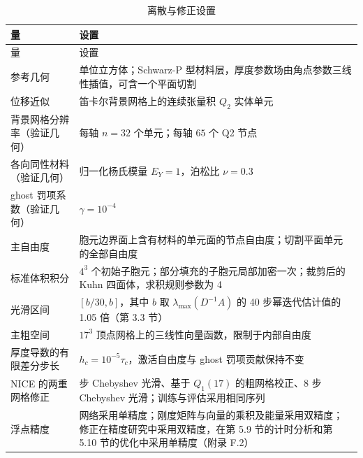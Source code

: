 \documentclass[preprint,12pt,authoryear]{elsarticle}
\begin{document}
{\small
\begin{longtable}[]{@{}
  >{\raggedright\arraybackslash}p{}
  >{\raggedright\arraybackslash}p{}@{}}
\caption{离散与修正设置}\tabularnewline
\toprule\noalign{}
\begin{minipage}[b]{\linewidth}\raggedright
量
\end{minipage} & \begin{minipage}[b]{\linewidth}\raggedright
设置
\end{minipage} \\
\midrule\noalign{}
\endfirsthead
\toprule\noalign{}
\begin{minipage}[b]{\linewidth}\raggedright
量
\end{minipage} & \begin{minipage}[b]{\linewidth}\raggedright
设置
\end{minipage} \\
\midrule\noalign{}
\endhead
\bottomrule\noalign{}
\endlastfoot
参考几何 & 单位立方体；Schwarz-P 型材料层，厚度参数场由角点参数三线性插值，可含一个平面切割 \\
位移近似 & 笛卡尔背景网格上的连续张量积 \(Q_2\) 实体单元 \\
背景网格分辨率（验证几何） & 每轴 \(n=32\) 个单元；每轴 \(65\) 个 Q2 节点 \\
各向同性材料（验证几何） & 归一化杨氏模量 \(E_Y=1\)，泊松比 \(\nu=0.3\) \\
ghost 罚项系数（验证几何） & \(\gamma=10^{-4}\) \\
主自由度 & 胞元边界面上含有材料的单元面的节点自由度；切割平面单元的全部自由度 \\
标准体积积分 & \(4^3\) 个初始子胞元；部分填充的子胞元局部加密一次；裁剪后的 Kuhn 四面体，求积规则参数为 4 \\
光滑区间 & \([b/30,b]\)，其中 \(b\) 取 \(\lambda_{\max}(D^{-1}A)\) 的 40 步幂迭代估计值的 1.05 倍（第 3.3 节） \\
主粗空间 & \(17^3\) 顶点网格上的三线性向量函数，限制于内部自由度 \\
厚度导数的有限差分步长 & \(h_c=10^{-5}\tau_c\)，激活自由度与 ghost 罚项贡献保持不变 \\
NICE 的两重网格修正 & 8 步 Chebyshev 光滑、基于 \(Q_1(17)\) 的粗网格校正、8 步 Chebyshev 光滑；训练与评估采用相同序列 \\
浮点精度 & 网络采用单精度；刚度矩阵与向量的乘积及能量采用双精度；修正在精度研究中采用双精度，在第 5.9 节的计时分析和第 5.10 节的优化中采用单精度（附录 F.2） \\
\end{longtable}}
\end{document}
